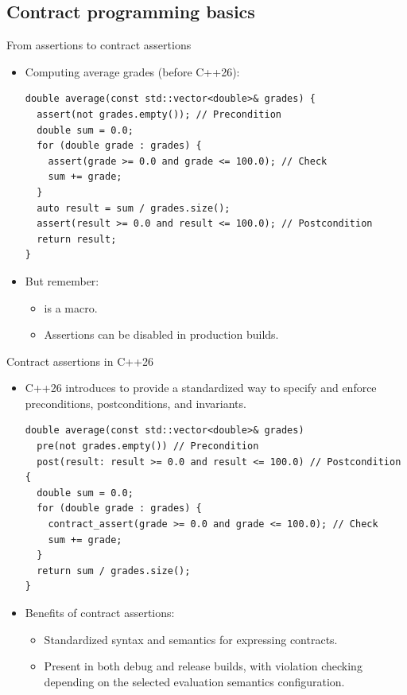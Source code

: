 \subsection{Contract programming basics}

\begin{frame}[t,fragile]{From assertions to contract assertions}
\begin{itemize}
  \item Computing average grades (before C++26):
\begin{lstlisting}
double average(const std::vector<double>& grades) {
  assert(not grades.empty()); // Precondition
  double sum = 0.0;
  for (double grade : grades) {
    assert(grade >= 0.0 and grade <= 100.0); // Check
    sum += grade;
  }
  auto result = sum / grades.size();
  assert(result >= 0.0 and result <= 100.0); // Postcondition
  return result;
}
\end{lstlisting}

  \item But remember:
    \begin{itemize}
      \item {} is a macro.
      \item Assertions can be disabled in production builds.
    \end{itemize}
\end{itemize}
\end{frame}

\begin{frame}[t,fragile]{Contract assertions in C++26}
\begin{itemize}
  \item C++26 introduces  to provide a standardized way to specify and enforce preconditions, postconditions, and invariants.
\begin{lstlisting}
double average(const std::vector<double>& grades) 
  pre(not grades.empty()) // Precondition
  post(result: result >= 0.0 and result <= 100.0) // Postcondition
{
  double sum = 0.0;
  for (double grade : grades) {
    contract_assert(grade >= 0.0 and grade <= 100.0); // Check
    sum += grade;
  }
  return sum / grades.size();
}
\end{lstlisting}
  \item Benefits of contract assertions:
    \begin{itemize}
      \item Standardized syntax and semantics for expressing contracts.
      \item Present in both debug and release builds, with violation checking depending on the selected evaluation semantics configuration.
    \end{itemize}
\end{itemize}
\end{frame}